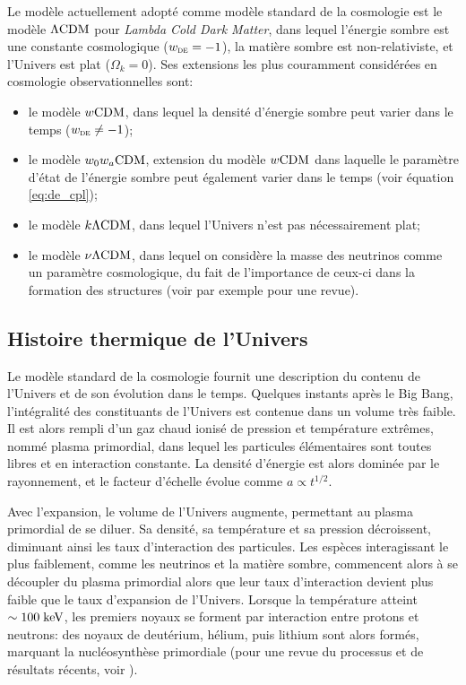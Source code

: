 Le modèle actuellement adopté comme modèle standard de la cosmologie est le modèle $\Lambda{\rm CDM}$ pour \textit{Lambda Cold Dark Matter}, dans lequel l'énergie sombre est une constante cosmologique ($w_\textsc{de} = -1$), la matière sombre est non-relativiste, et l'Univers est plat ($\Omega_k = 0$).
Ses extensions les plus couramment considérées en cosmologie observationnelles sont:
\begin{itemize}[leftmargin=*]
    \setlength\itemsep{5pt}
\item le modèle $w{\rm CDM}$, dans lequel la densité d'énergie sombre peut varier dans le temps ($w_\textsc{de} \neq -1$);
\item le modèle $w_0 w_a {\rm CDM}$, extension du modèle $w{\rm CDM}$ dans laquelle le paramètre d'état de l'énergie sombre peut également varier dans le temps (voir équation \ref{eq:de_cpl});
\item le modèle $k{\rm \Lambda CDM}$, dans lequel l'Univers n'est pas nécessairement plat;
\item le modèle $\nu{\rm \Lambda CDM}$, dans lequel on considère la masse des neutrinos comme un paramètre cosmologique, du fait de l'importance de ceux-ci dans la formation des structures (voir par exemple \cite{lesgourgues_massive_2006} pour une revue).
\end{itemize}

\subsection{Histoire thermique de l'Univers}

Le modèle standard de la cosmologie fournit une description du contenu de l'Univers et de son évolution dans le temps.
Quelques instants après le Big Bang, l'intégralité des constituants de l'Univers est contenue dans un volume très faible.
Il est alors rempli d'un gaz chaud ionisé de pression et température extrêmes, nommé plasma primordial, dans lequel les particules élémentaires sont toutes libres et en interaction constante.
La densité d'énergie est alors dominée par le rayonnement, et le facteur d'échelle évolue comme $a \propto t^{1/2}$.

Avec l'expansion, le volume de l'Univers augmente, permettant au plasma primordial de se diluer.
Sa densité, sa température et sa pression décroissent, diminuant ainsi les taux d'interaction des particules.
Les espèces interagissant le plus faiblement, comme les neutrinos et la matière sombre, commencent alors à se découpler du plasma primordial alors que leur taux d'interaction devient plus faible que le taux d'expansion de l'Univers.
Lorsque la température atteint $\sim 100 \;{\rm keV}$, les premiers noyaux se forment par interaction entre protons et neutrons: des noyaux de deutérium, hélium, puis lithium sont alors formés, marquant la nucléosynthèse primordiale (pour une revue du processus et de résultats récents, voir \cite{cyburt_big_2016}).

